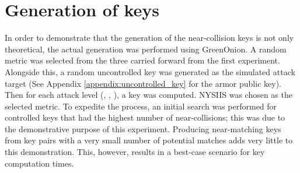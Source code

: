 \section{Generation of keys}
\label{sec:key_gen}
In order to demonstrate that the generation of the near-collision keys is not only theoretical, the actual generation was performed using GreenOnion. A random metric was selected from the three carried forward from the first experiment. Alongside this, a random uncontrolled key was generated as the simulated attack target (See Appendix \ref{appendix:uncontrolled_key} for the armor public key). Then for each attack level (\OOOO, \XOOO, \XOOX), a key was computed. NYSIIS was chosen as the selected metric. To expedite the process, an initial search was performed for controlled keys that had the highest number of near-collisions; this was due to the demonstrative purpose of this experiment. Producing near-matching keys from key pairs with a very small number of potential matches adds very little to this demonstration. This, however, results in a best-case scenario for key computation times.

